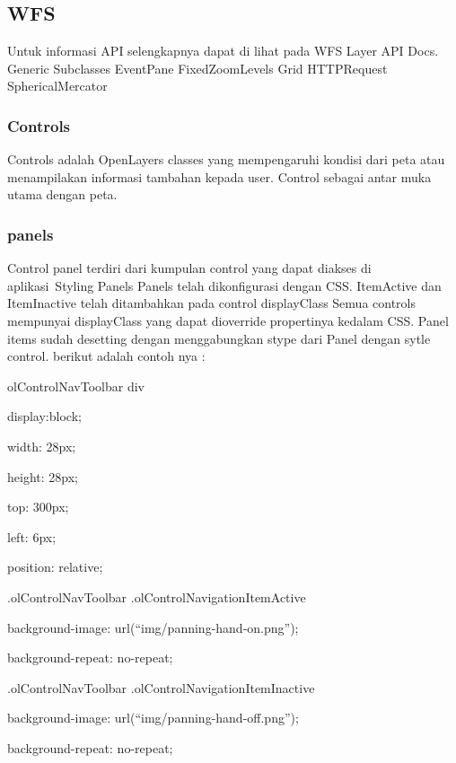 \documentclass{article}
\begin{document}
\subsection {WFS}
Untuk informasi API selengkapnya dapat di lihat pada WFS Layer API Docs.
Generic Subclasses
EventPane
FixedZoomLevels
Grid
HTTPRequest
SphericalMercator

\subsubsection {Controls}
Controls adalah OpenLayers classes yang mempengaruhi kondisi dari peta atau menampilakan informasi tambahan kepada user. Control sebagai antar muka utama dengan peta.

\subsubsection {panels}
Control panel terdiri dari kumpulan control yang dapat diakses di aplikasi Styling Panels
Panels telah dikonfigurasi dengan CSS. ItemActive dan ItemInactive telah ditambahkan pada control displayClass
Semua controls mempunyai displayClass yang dapat dioverride propertinya kedalam CSS. Panel items sudah desetting dengan menggabungkan stype dari Panel dengan sytle control. berikut adalah contoh nya :

olControlNavToolbar div {

display:block;

width: 28px;

height: 28px;

top: 300px;

left: 6px;

position: relative;

}

.olControlNavToolbar .olControlNavigationItemActive {

background-image: url(“img/panning-hand-on.png”);

background-repeat: no-repeat;

}

.olControlNavToolbar .olControlNavigationItemInactive {

background-image: url(“img/panning-hand-off.png”);

background-repeat: no-repeat;

}
\end{document}
